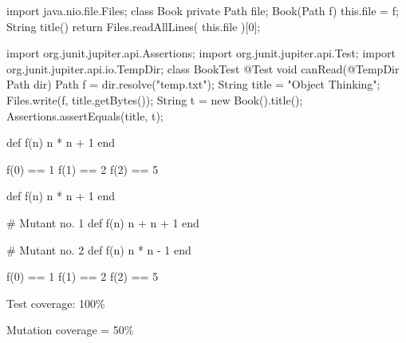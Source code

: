 \documentclass{article}
\begin{document}
\clearpage\begin{innoWide}{2}\small
\begin{ffcode}
import java.nio.file.Files;
class Book {
  private Path file;
  Book(Path f) {
    this.file = f;
  }
  String title() {
    return Files.readAllLines(
      this.file
    )[0];
  }
}
\end{ffcode}
\par\columnbreak
\begin{ffcode}
import org.junit.jupiter.api.Assertions;
import org.junit.jupiter.api.Test;
import org.junit.jupiter.api.io.TempDir;
class BookTest {
  @Test
  void canRead(@TempDir Path dir) {
    Path f = dir.resolve("temp.txt");
    String title = "Object Thinking";
    Files.write(f, title.getBytes());
    String t = new Book().title();
    Assertions.assertEquals(title, t);
  }
}
\end{ffcode}
\end{innoWide}\clearpage




\clearpage
{}
\begin{innoWide}{2}\small
\begin{ffcode}
def f(n)
  n * n + 1
end
\end{ffcode}
\par\columnbreak
\begin{ffcode}
f(0) == 1
f(1) == 2
f(2) == 5
\end{ffcode}
\end{innoWide}\clearpage

\clearpage
{}
\begin{innoWide}{2}\small
\begin{ffcode}
def f(n)
  n * n + 1
end

# Mutant no. 1
def f(n)
  n + n + 1
end

# Mutant no. 2
def f(n)
  n * n - 1
end
\end{ffcode}
\par\columnbreak
\begin{ffcode}
f(0) == 1
f(1) == 2
f(2) == 5
\end{ffcode}

Test coverage: 100\% \par
Mutation coverage = 50\%
\end{innoWide}\clearpage
\end{document}
